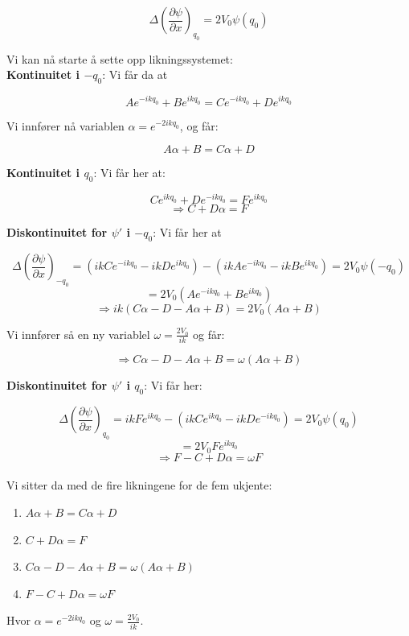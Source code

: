 \documentclass[a4paper,norsk, 10pt]{article}
\numberwithin{equation}{section}
\begin{document}
\begin{equation}
\Delta \left(\frac{\partial \psi}{\partial x}\right)_{q_0} = 2V_0\psi(q_0)
\end{equation}



Vi kan nå starte å sette opp likningssystemet:\\

\textbf{Kontinuitet i $-q_0$}: 
Vi får da at 

$$
Ae^{-ikq_0} + Be^{ikq_0} = Ce^{-ikq_0} + De^{ikq_0}
$$

Vi innfører nå variablen $\alpha = e^{-2ikq_0}$, og får:

$$
A\alpha + B =C\alpha + D
$$

\textbf{Kontinuitet i $q_0$}: 
Vi får her at:

$$
Ce^{ikq_0} + De^{-ikq_0} = Fe^{ikq_0} 
$$
$$
\Rightarrow C + D\alpha = F
$$

\newpage

\textbf{Diskontinuitet for $\psi'$ i $-q_0$}: Vi får her at

$$
\Delta \left(\frac{\partial \psi}{\partial x}\right)_{-q_0} = (ikCe^{-ikq_0} -ikDe^{ikq_0} ) - (ikAe^{-ikq_0} - ikBe^{ikq_0}) = 2V_0\psi(-q_0) 
$$
$$
= 2V_0(Ae^{-ikq_0} + Be^{ikq_0})
$$
$$
\Rightarrow ik(C\alpha - D -A\alpha + B) = 2V_0(A\alpha + B)
$$

Vi innfører så en ny variablel $\omega = \frac{2V_0}{ik}$ og får:

$$
\Rightarrow C\alpha - D -A\alpha + B = \omega(A\alpha + B)
$$

\textbf{Diskontinuitet for $\psi'$ i $q_0$}:
Vi får her:

$$
\Delta \left(\frac{\partial \psi}{\partial x}\right)_{q_0} = ikFe^{ikq_0} - (ikCe^{ikq_0} -ikDe^{-ikq_0}) = 2V_0\psi(q_0)
$$
$$
= 2V_0Fe^{ikq_0}
$$
$$
\Rightarrow F - C + D\alpha = \omega F 
$$\\


Vi sitter da med de fire likningene for de fem ukjente:

\begin{enumerate}
\item $A\alpha + B = C\alpha + D$
\item $C + D\alpha = F$
\item $C\alpha - D -A\alpha + B = \omega(A\alpha + B)$
\item $F - C + D\alpha = \omega F $
\end{enumerate}

Hvor $\alpha = e^{-2ikq_0}$ og $\omega = \frac{2V_0}{ik}$.\\
\end{document}
